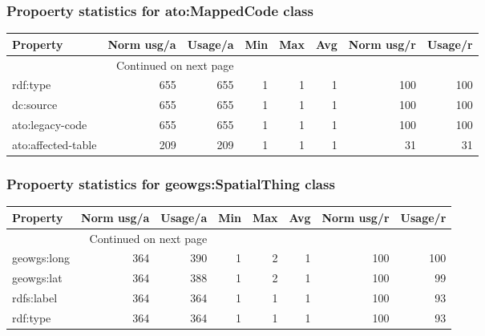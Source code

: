 \documentclass[10pt,a4paper,titlepage,final]{article}
\begin{document}
\subsubsection{Propoerty statistics for ato:MappedCode class}
\begin{longtable}{lrrrrrrr}
\toprule
           Property &  Norm usg/a &  Usage/a &  Min &  Max &  Avg &  Norm usg/r &  Usage/r \\
\midrule
\endhead
\midrule
\multicolumn{3}{r}{{Continued on next page}} \\
\midrule
\endfoot

\bottomrule
\endlastfoot
           rdf:type &         655 &      655 &    1 &    1 &    1 &         100 &      100 \\
          dc:source &         655 &      655 &    1 &    1 &    1 &         100 &      100 \\
    ato:legacy-code &         655 &      655 &    1 &    1 &    1 &         100 &      100 \\
 ato:affected-table &         209 &      209 &    1 &    1 &    1 &          31 &       31 \\
\end{longtable}


\subsubsection{Propoerty statistics for geowgs:SpatialThing class}
\begin{longtable}{lrrrrrrr}
\toprule
    Property &  Norm usg/a &  Usage/a &  Min &  Max &  Avg &  Norm usg/r &  Usage/r \\
\midrule
\endhead
\midrule
\multicolumn{3}{r}{{Continued on next page}} \\
\midrule
\endfoot

\bottomrule
\endlastfoot
 geowgs:long &         364 &      390 &    1 &    2 &    1 &         100 &      100 \\
  geowgs:lat &         364 &      388 &    1 &    2 &    1 &         100 &       99 \\
  rdfs:label &         364 &      364 &    1 &    1 &    1 &         100 &       93 \\
    rdf:type &         364 &      364 &    1 &    1 &    1 &         100 &       93 \\
\end{longtable}
\end{document}
